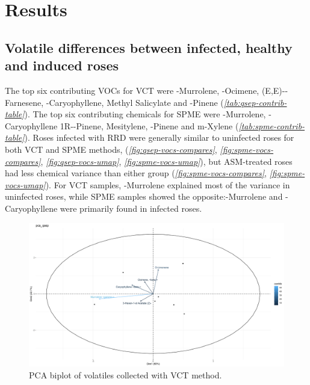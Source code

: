 \documentclass[12pt,final,CPage]{ufthesis}
\begin{document}
{{  \section{Results}\label{results-vocs-olfact}}

  \hypertarget{results-vocs}{%
  \subsection{Volatile differences between infected, healthy and induced roses}\label{results-vocs}}

  The top six contributing VOCs for VCT were \textgamma-Murrolene, \textbeta-Ocimene, (E,E)-\textalpha-Farnesene, \textbeta-Caryophyllene, Methyl Salicylate and \textbeta-Pinene (\emph{\ref{tab:qsep-contrib-table}}). The top six contributing chemicals for SPME were \textgamma-Murrolene, \textbeta-Caryophyllene 1R-\textalpha-Pinene, Mesitylene, \textbeta-Pinene and m-Xylene (\emph{\ref{tab:spme-contrib-table}}). Roses infected with RRD were generally similar to uninfected roses for both VCT and SPME methods, (\emph{\ref{fig:qsep-vocs-compares}}, \emph{\ref{fig:spme-vocs-compares}}, \emph{\ref{fig:qsep-vocs-umap}}, \emph{\ref{fig:spme-vocs-umap}}), but ASM-treated roses had less chemical variance than either group (\emph{\ref{fig:spme-vocs-compares}}, \emph{\ref{fig:spme-vocs-umap}}). For VCT samples, \textgamma-Murrolene explained most of the variance in uninfected roses, while SPME samples showed the opposite:\textgamma-Murrolene and \textbeta-Caryophyllene were primarily found in infected roses.
  \begin{figure}

  {\centering \includegraphics[width=1\linewidth]{figure/rrv_volatiles_biplot_var_pca_qsep} 

  }

  \caption{PCA biplot of volatiles collected with VCT method.}\label{fig:qsep-vocs}
  \end{figure}
  \begin{figure}


\end{figure}}
\end{document}
